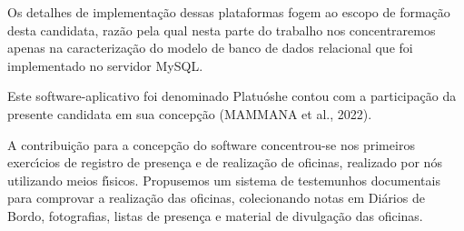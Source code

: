 \documentclass[
12pt,		%
openright,	%
twoside,  %
a4paper,			%
chapter=TITLE,		%
english,			%
french,				%
spanish,			%
brazil				%
]{USPSC-classe/USPSC}
\begin{document}
Os detalhes de implementa\c{c}\~ao dessas plataformas fogem ao escopo de forma\c{c}\~ao desta candidata, raz\~ao pela qual nesta parte do trabalho nos concentraremos apenas na caracteriza\c{c}\~ao do modelo de banco de dados relacional que foi implementado no servidor MySQL.










Este software-aplicativo foi denominado \textquotedbl Platu\'osh\textquotedbl  e contou com a participa\c{c}\~ao da presente candidata em sua concep\c{c}\~ao  (MAMMANA et al., 2022).










A contribui\c{c}\~ao para a concep\c{c}\~ao do software concentrou-se nos primeiros exerc\'{\i}cios de registro de presen\c{c}a e de realiza\c{c}\~ao de oficinas, realizado por n\'os utilizando meios f\'{\i}sicos. Propusemos um sistema de testemunhos documentais para comprovar a realiza\c{c}\~ao das oficinas, colecionando notas em Di\'arios de Bordo, fotografias, listas de presen\c{c}a e material de divulga\c{c}\~ao das oficinas.
\end{document}
